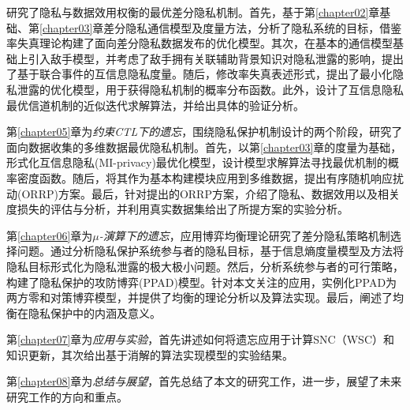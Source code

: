 研究了隐私与数据效用权衡的最优差分隐私机制。首先，基于第\ref{chapter02}章基础、第\ref{chapter03}章差分隐私通信模型及度量方法，分析了隐私系统的目标，借鉴率失真理论构建了面向差分隐私数据发布的优化模型。其次，在基本的通信模型基础上引入敌手模型，并考虑了敌手拥有关联辅助背景知识对隐私泄露的影响，提出了基于联合事件的互信息隐私度量。随后，修改率失真表述形式，提出了最小化隐私泄露的优化模型，用于获得隐私机制的概率分布函数。此外，设计了互信息隐私最优信道机制的近似迭代求解算法，并给出具体的验证分析。

第\ref{chapter05}章为{\em 约束CTL下的遗忘}，围绕隐私保护机制设计的两个阶段，研究了面向数据收集的多维数据最优隐私机制。首先，以第\ref{chapter03}章的度量为基础，形式化互信息隐私(MI-privacy)最优化模型，设计模型求解算法寻找最优机制的概率密度函数。随后，将其作为基本构建模块应用到多维数据，提出有序随机响应扰动(ORRP)方案。最后，针对提出的ORRP方案，介绍了隐私、数据效用以及相关度损失的评估与分析，并利用真实数据集给出了所提方案的实验分析。


第\ref{chapter06}章为{\em $\mu$-演算下的遗忘}，应用博弈均衡理论研究了差分隐私策略机制选择问题。通过分析隐私保护系统参与者的隐私目标，基于信息熵度量模型及方法将隐私目标形式化为隐私泄露的极大极小问题。然后，分析系统参与者的可行策略，构建了隐私保护的攻防博弈(PPAD)模型。针对本文关注的应用，实例化PPAD为两方零和对策博弈模型，并提供了均衡的理论分析以及算法实现。最后，阐述了均衡在隐私保护中的内涵及意义。


第\ref{chapter07}章为\textit{应用与实验}，首先讲述如何将遗忘应用于计算SNC（WSC）和知识更新，其次给出基于消解的算法实现模型的实验结果。


第\ref{chapter08}章为\textit{总结与展望}，首先总结了本文的研究工作，进一步，展望了未来研究工作的方向和重点。
